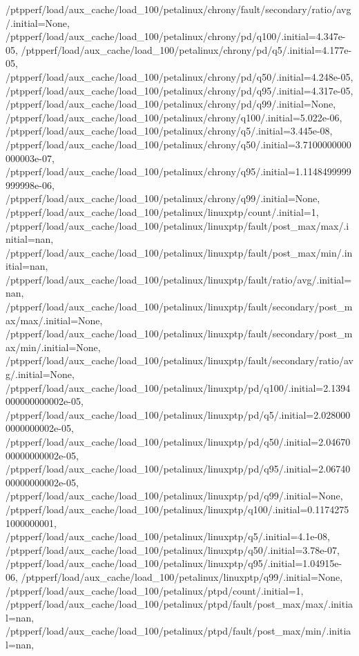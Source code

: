 {    /ptpperf/load/aux_cache/load_100/petalinux/chrony/fault/secondary/ratio/avg/.initial=None,
    /ptpperf/load/aux_cache/load_100/petalinux/chrony/pd/q100/.initial=4.347e-05,
    /ptpperf/load/aux_cache/load_100/petalinux/chrony/pd/q5/.initial=4.177e-05,
    /ptpperf/load/aux_cache/load_100/petalinux/chrony/pd/q50/.initial=4.248e-05,
    /ptpperf/load/aux_cache/load_100/petalinux/chrony/pd/q95/.initial=4.317e-05,
    /ptpperf/load/aux_cache/load_100/petalinux/chrony/pd/q99/.initial=None,
    /ptpperf/load/aux_cache/load_100/petalinux/chrony/q100/.initial=5.022e-06,
    /ptpperf/load/aux_cache/load_100/petalinux/chrony/q5/.initial=3.445e-08,
    /ptpperf/load/aux_cache/load_100/petalinux/chrony/q50/.initial=3.7100000000000003e-07,
    /ptpperf/load/aux_cache/load_100/petalinux/chrony/q95/.initial=1.1148499999999998e-06,
    /ptpperf/load/aux_cache/load_100/petalinux/chrony/q99/.initial=None,
    /ptpperf/load/aux_cache/load_100/petalinux/linuxptp/count/.initial=1,
    /ptpperf/load/aux_cache/load_100/petalinux/linuxptp/fault/post_max/max/.initial=nan,
    /ptpperf/load/aux_cache/load_100/petalinux/linuxptp/fault/post_max/min/.initial=nan,
    /ptpperf/load/aux_cache/load_100/petalinux/linuxptp/fault/ratio/avg/.initial=nan,
    /ptpperf/load/aux_cache/load_100/petalinux/linuxptp/fault/secondary/post_max/max/.initial=None,
    /ptpperf/load/aux_cache/load_100/petalinux/linuxptp/fault/secondary/post_max/min/.initial=None,
    /ptpperf/load/aux_cache/load_100/petalinux/linuxptp/fault/secondary/ratio/avg/.initial=None,
    /ptpperf/load/aux_cache/load_100/petalinux/linuxptp/pd/q100/.initial=2.1394000000000002e-05,
    /ptpperf/load/aux_cache/load_100/petalinux/linuxptp/pd/q5/.initial=2.0280000000000002e-05,
    /ptpperf/load/aux_cache/load_100/petalinux/linuxptp/pd/q50/.initial=2.0467000000000002e-05,
    /ptpperf/load/aux_cache/load_100/petalinux/linuxptp/pd/q95/.initial=2.0674000000000002e-05,
    /ptpperf/load/aux_cache/load_100/petalinux/linuxptp/pd/q99/.initial=None,
    /ptpperf/load/aux_cache/load_100/petalinux/linuxptp/q100/.initial=0.11742751000000001,
    /ptpperf/load/aux_cache/load_100/petalinux/linuxptp/q5/.initial=4.1e-08,
    /ptpperf/load/aux_cache/load_100/petalinux/linuxptp/q50/.initial=3.78e-07,
    /ptpperf/load/aux_cache/load_100/petalinux/linuxptp/q95/.initial=1.04915e-06,
    /ptpperf/load/aux_cache/load_100/petalinux/linuxptp/q99/.initial=None,
    /ptpperf/load/aux_cache/load_100/petalinux/ptpd/count/.initial=1,
    /ptpperf/load/aux_cache/load_100/petalinux/ptpd/fault/post_max/max/.initial=nan,
    /ptpperf/load/aux_cache/load_100/petalinux/ptpd/fault/post_max/min/.initial=nan,
}
